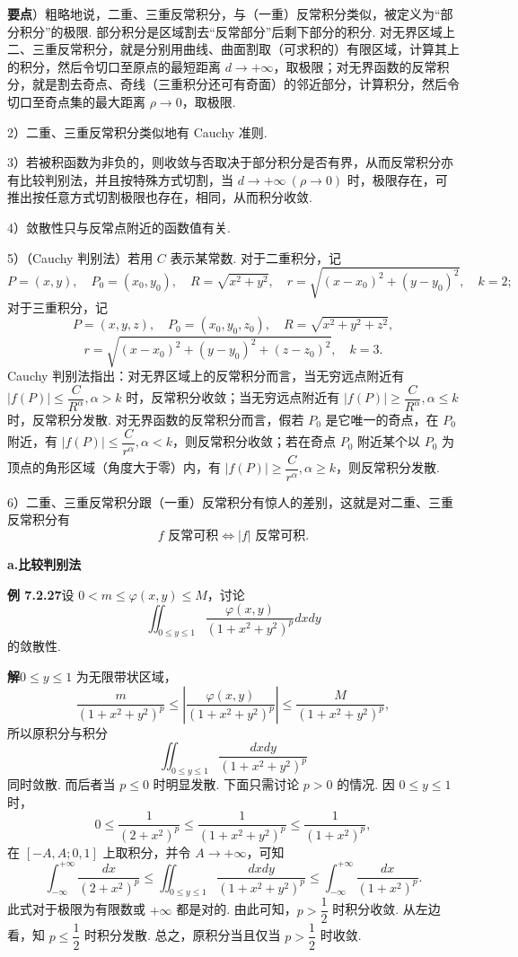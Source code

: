 \documentclass[UTF8, 12pt, fontset=fandol, oneside]{ctexart}
\begin{document}
\noindent\textbf{要点}）粗略地说，二重、三重反常积分，与（一重）反常积分类似，被定义为“部分积分”的极限. 部分积分是区域割去“反常部分”后剩下部分的积分. 对无界区域上二、三重反常积分，就是分别用曲线、曲面割取（可求积的）有限区域，计算其上的积分，然后令切口至原点的最短距离 $d\to+\infty$，取极限；对无界函数的反常积分，就是割去奇点、奇线（三重积分还可有奇面）的邻近部分，计算积分，然后令切口至奇点集的最大距离 $\rho\to0$，取极限.

2）二重、三重反常积分类似地有 Cauchy 准则.

3）若被积函数为非负的，则收敛与否取决于部分积分是否有界，从而反常积分亦有比较判别法，并且按特殊方式切割，当 $d\to+\infty\ (\rho\to0)$ 时，极限存在，可推出按任意方式切割极限也存在，相同，从而积分收敛.

4）敛散性只与反常点附近的函数值有关.

5）（Cauchy 判别法）若用 $C$ 表示某常数. 对于二重积分，记
\[
P=(x,y),\quad P_0=(x_0,y_0),\quad R=\sqrt{x^2+y^2},\quad
r=\sqrt{(x-x_0)^2+(y-y_0)^2},\quad k=2;
\]
对于三重积分，记
\[
P=(x,y,z),\quad P_0=(x_0,y_0,z_0),\quad R=\sqrt{x^2+y^2+z^2},
\]
\[
r=\sqrt{(x-x_0)^2+(y-y_0)^2+(z-z_0)^2},\quad k=3.
\]
Cauchy 判别法指出：对无界区域上的反常积分而言，当无穷远点附近有 $|f(P)|\le\dfrac C{R^\alpha},\alpha>k$ 时，反常积分收敛；当无穷远点附近有 $|f(P)|\ge\dfrac C{R^\alpha},\alpha\le k$ 时，反常积分发散. 对无界函数的反常积分而言，假若 $P_0$ 是它唯一的奇点，在 $P_0$ 附近，有 $|f(P)|\le\dfrac C{r^\alpha},\alpha<k$，则反常积分收敛；若在奇点 $P_0$ 附近某个以 $P_0$ 为顶点的角形区域（角度大于零）内，有 $|f(P)|\ge\dfrac C{r^\alpha},\alpha\ge k$，则反常积分发散.

6）二重、三重反常积分跟（一重）反常积分有惊人的差别，这就是对二重、三重反常积分有
\[
f\text{ 反常可积}\Longleftrightarrow |f|\text{ 反常可积}.
\]

\noindent\textbf{a.\quad 比较判别法}

\noindent\textbf{例 7.2.27}\quad 设 $0<m\le\varphi(x,y)\le M$，讨论
\[
\iint_{0\le y\le1}\frac{\varphi(x,y)}{(1+x^2+y^2)^p}dxdy
\]
的敛散性.

\noindent\textbf{解}\quad $0\le y\le1$ 为无限带状区域，
\[
\frac m{(1+x^2+y^2)^p}\le
\left|\frac{\varphi(x,y)}{(1+x^2+y^2)^p}\right|
\le\frac M{(1+x^2+y^2)^p},
\]
所以原积分与积分
\[
\iint_{0\le y\le1}\frac{dxdy}{(1+x^2+y^2)^p}
\]
同时敛散. 而后者当 $p\le0$ 时明显发散. 下面只需讨论 $p>0$ 的情况. 因 $0\le y\le1$ 时，
\[
0\le\frac1{(2+x^2)^p}\le\frac1{(1+x^2+y^2)^p}\le\frac1{(1+x^2)^p},
\]
在 $[-A,A;0,1]$ 上取积分，并令 $A\to+\infty$，可知
\[
\int_{-\infty}^{+\infty}\frac{dx}{(2+x^2)^p}
\le\iint_{0\le y\le1}\frac{dxdy}{(1+x^2+y^2)^p}
\le\int_{-\infty}^{+\infty}\frac{dx}{(1+x^2)^p}.
\]
此式对于极限为有限数或 $+\infty$ 都是对的. 由此可知，$p>\dfrac12$ 时积分收敛. 从左边看，知 $p\le\dfrac12$ 时积分发散. 总之，原积分当且仅当 $p>\dfrac12$ 时收敛.
\end{document}
